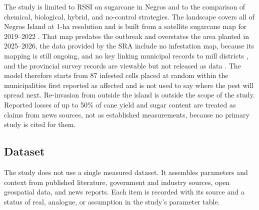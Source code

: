 The study is limited to RSSI on sugarcane in Negros and to the comparison of chemical, biological, hybrid, and no-control strategies. The landscape covers all of Negros Island at 1-ha resolution and is built from a satellite sugarcane map for 2019--2022 \citep{DiTommaso2024}. That map predates the outbreak and overstates the area planted in 2025--2026, the data provided by the SRA include no infestation map, because its mapping is still ongoing, and no key linking municipal records to mill districts \citep{SRA2026FOI}, and the provincial survey records are viewable but not released as data \citep{PGNO2026}. The model therefore starts from 87 infested cells placed at random within the municipalities first reported as affected and is not used to say where the pest will spread next. Re-invasion from outside the island is outside the scope of the study. Reported losses of up to 50\% of cane yield and sugar content \citep{ChiniMandi2026} are treated as claims from news sources, not as established measurements, because no primary study is cited for them.

\subsection{Dataset}

The study does not use a single measured dataset. It assembles parameters and context from published literature, government and industry sources, open geospatial data, and news reports. Each item is recorded with its source and a status of real, analogue, or assumption in the study's parameter table.

